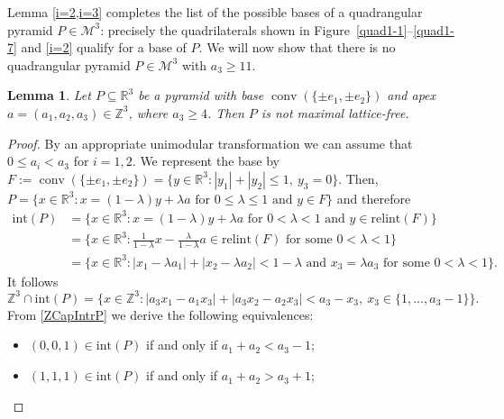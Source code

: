 \documentclass[a4paper]{article}
\theoremstyle{plain}
\newtheorem{lemma}[nn]{Lemma}
\begin{document}
Lemma \ref{i=2,i=3} completes the list of the possible
bases of a quadrangular pyramid $P \in {\mathcal{M}^3}$: precisely the
quadrilaterals shown in Figure~\ref{quad1-1}--\ref{quad1-7}
and \ref{i=2} qualify for a base of $P$.
We will now show that there is no quadrangular pyramid
$P \in {\mathcal{M}^3}$ with $a_3 \geq 11$.

\begin{lemma} \label{DiamondBasis}
Let $P \subseteq {\mathbb{R}}^3$ be a pyramid with base ${{\mathop{\mathrm{{conv}}}}}(\{ \pm
e_1, \pm e_2 \})$ and apex $a = (a_1, a_2, a_3) \in {\mathbb{Z}}^3$,
where $a_3 \geq 4$.
Then $P$ is not maximal lattice-free.
\end{lemma}

\begin{proof}
By an appropriate unimodular transformation we can assume
that $0 \le a_i < a_3$ for $i = 1,2$.
We represent the base by $F := {{\mathop{\mathrm{{conv}}}}}(\{ \pm e_1, \pm e_2 \})
= \{y \in {\mathbb{R}}^3: |y_1|+|y_2| \le 1,\ y_3 = 0\}$.
Then, $P = \{x \in {\mathbb{R}}^3: x = (1 - \lambda) y + \lambda a
\mbox{ for } 0 \le \lambda \le 1 \mbox{ and } y \in F\}$ and
therefore
\begin{align*}
  {\mathrm{int}}(P) & = \{x \in {\mathbb{R}}^3: x = (1 - \lambda) y + \lambda a
               \mbox{ for } 0 < \lambda < 1 \mbox{ and } y
               \in {\mathrm{relint}}(F)\} \\
           & = \{x \in {\mathbb{R}}^3: \frac{1}{1-\lambda} x -
               \frac{\lambda}{1-\lambda} a \in {\mathrm{relint}} (F)
               \text{ for some } 0 < \lambda < 1\} \\
           & = \{x \in {\mathbb{R}}^3: |x_1 - \lambda a_1| + |x_2 -
               \lambda a_2| < 1 - \lambda \text{ and } x_3 =
               \lambda a_3 \text{ for some } 0 < \lambda <
               1\}.
\end{align*}
It follows 
\begin{equation} \label{ZCapIntrP}
  {\mathbb{Z}}^3 \cap {\mathrm{int}}(P) = \{x \in {\mathbb{Z}}^3: |a_3 x_1 - a_1 x_3| +
  |a_3 x_2 - a_2 x_3| < a_3 - x_3,\  x_3 \in \{1, \dots, a_3
  - 1\} \}.
\end{equation}
From \eqref{ZCapIntrP} we derive the following equivalences:
\begin{itemize} 
  \item $(0,0,1) \in {\mathrm{int}}(P)$ if and only if $a_1 + a_2 < a_3 - 1$;
  \item $(1,1,1) \in {\mathrm{int}}(P)$ if and only if $a_1 + a_2 > a_3 + 1$; 

\end{itemize}
\end{proof}
\end{document}
